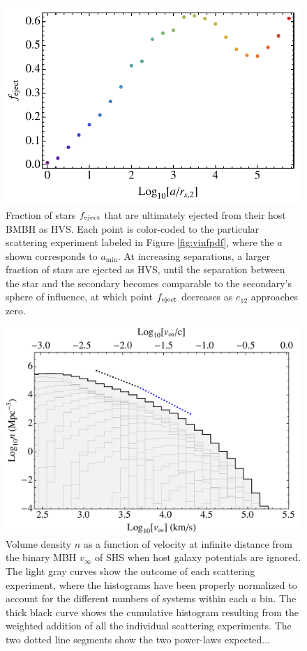 \documentclass[a4paper,twocolumn]{emulateapj}
\begin{document}
\begin{figure}
\centering\includegraphics[width=0.9\linewidth,clip=true]{feject}
\caption{Fraction of stars $f_{\rm eject}$ that are ultimately ejected from their host BMBH as HVS. Each point is color-coded to the particular scattering experiment labeled in Figure \ref{fig:vinfpdf}, where the $a$ shown corresponds to $a_{\min}$. At increasing separations, a larger fraction of stars are ejected as HVS, until the separation between the star and the secondary becomes comparable to the secondary's sphere of influence, at which point $f_{\rm eject}$ decreases as $e_{12}$ approaches zero.}
\label{fig:feject}
\end{figure}

\begin{figure}
\centering\includegraphics[width=0.7\linewidth,clip=true]{histogram}
\caption{Volume density $n$ as a function of velocity at infinite distance from the binary MBH $v_{\infty}$ of SHS when host galaxy potentials are ignored. The light gray curves show the outcome of each scattering experiment, where the histograms have been properly normalized to account for the different numbers of systems within each $a$ bin. The thick black curve shows the cumulative histogram resulting from the weighted addition of all the individual scattering experiments. The two dotted line segments show the two power-laws expected...}
\label{fig:histogram}
\end{figure}
\end{document}
